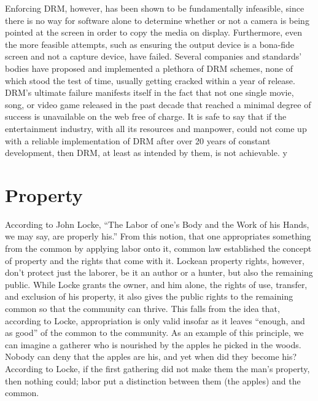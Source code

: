 \documentclass[12pt,letterpaper]{article}
\begin{document}
Enforcing DRM, however, has been shown to be fundamentally infeasible, since there is no way for software alone to determine whether or not a camera is being pointed at the screen in order to copy the media on display. Furthermore, even the more feasible attempts, such as ensuring the output device is a bona-fide screen and not a capture device, have failed. Several companies and standards' bodies have proposed and implemented a plethora of DRM schemes, none of which stood the test of time, usually getting cracked within a year of release. DRM's ultimate failure manifests itself in the fact that not one single movie, song, or video game released in the past decade that reached a minimal degree of success is unavailable on the web free of charge. It is safe to say that if the entertainment industry, with all its resources and manpower, could not come up with a reliable implementation of DRM after over 20 years of constant development, then DRM, at least as intended by them, is not achievable.
y
\section{Property}
According to John Locke, ``The Labor of one's Body and the Work of his Hands, we may say, are properly his.''\autocite[\pno~287]{locke-1988} From this notion, that one appropriates something from the common by applying labor onto it, common law established the concept of property and the rights that come with it. Lockean property rights, however, don't protect just the laborer, be it an author or a hunter, but also the remaining public. While Locke grants the owner, and him alone, the rights of
use, transfer, and exclusion of his property, it also gives the public rights to the remaining common so that the community can thrive.\autocite[\pno~119]{favale-2014} This falls from the idea that, according to Locke, appropriation is only valid insofar as it leaves ``enough, and as good''\autocite[\pno~291]{locke-1988} of the common to the community. As an example of this principle, we can imagine a gatherer who is nourished by the apples he picked in the woods. Nobody can deny that the
apples are his, and yet when did they become his? According to Locke, if the first gathering did not make them the man's property, then nothing could; labor put a distinction between them (the apples) and the common.\autocite[\pno~288]{locke-1988}
\end{document}
